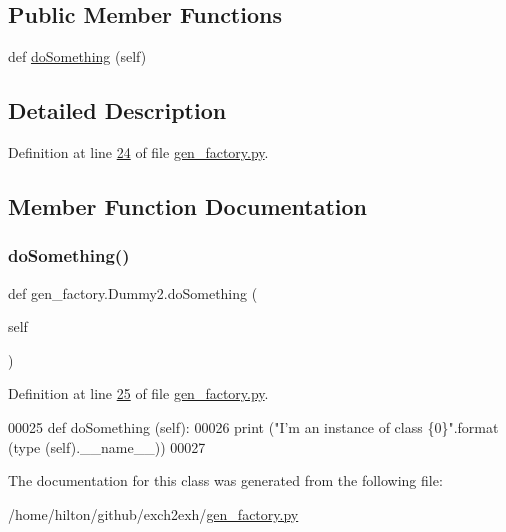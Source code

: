 \subsection*{Public Member Functions}
\begin{DoxyCompactItemize}
\item 
def \hyperlink{classgen__factory_1_1_dummy2_a22fc655957f756c7967b655b83375c66}{do\+Something} (self)
\end{DoxyCompactItemize}


\subsection{Detailed Description}


Definition at line \hyperlink{gen__factory_8py_source_l00024}{24} of file \hyperlink{gen__factory_8py_source}{gen\+\_\+factory.\+py}.



\subsection{Member Function Documentation}
\mbox{\label{classgen__factory_1_1_dummy2_a22fc655957f756c7967b655b83375c66}} 
\subsubsection{\texorpdfstring{do\+Something()}{doSomething()}}
{\footnotesize\ttfamily def gen\+\_\+factory.\+Dummy2.\+do\+Something (\begin{DoxyParamCaption}\item[{}]{self }\end{DoxyParamCaption})}



Definition at line \hyperlink{gen__factory_8py_source_l00025}{25} of file \hyperlink{gen__factory_8py_source}{gen\+\_\+factory.\+py}.


\begin{DoxyCode}
00025     \textcolor{keyword}{def }doSomething (self):
00026         \textcolor{keywordflow}{print} (\textcolor{stringliteral}{"I'm an instance of class \{0\}"}.format (type (self).\_\_name\_\_))
00027 
\end{DoxyCode}


The documentation for this class was generated from the following file\+:\begin{DoxyCompactItemize}
\item 
/home/hilton/github/exch2exh/\hyperlink{gen__factory_8py}{gen\+\_\+factory.\+py}\end{DoxyCompactItemize}
